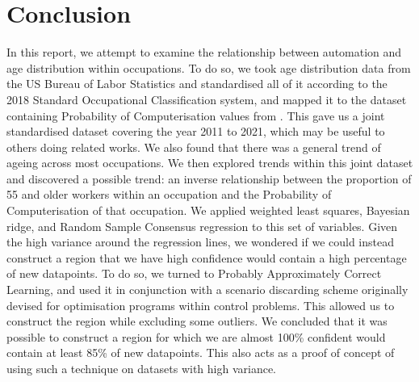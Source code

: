 \documentclass[11pt]{article}
\begin{document}
\clearpage

\section{Conclusion}
\label{sec:Conclusion}
In this report, we attempt to examine the relationship between automation and age distribution within occupations. To do so, we took age distribution data from the US Bureau of Labor Statistics and standardised all of it according to the 2018 Standard Occupational Classification system, and mapped it to the dataset containing Probability of Computerisation values from \cite{osborne2017future}. This gave us a joint standardised dataset covering the year 2011 to 2021, which may be useful to others doing related works. We also found that there was a general trend of ageing across most occupations. We then explored trends within this joint dataset and discovered a possible trend: an inverse relationship between the proportion of 55 and older workers within an occupation and the Probability of Computerisation of that occupation. We applied weighted least squares, Bayesian ridge, and Random Sample Consensus regression to this set of variables. Given the high variance around the regression lines, we wondered if we could instead construct a region that we have high confidence would contain a high percentage of new datapoints. To do so, we turned to Probably Approximately Correct Learning, and used it in conjunction with a scenario discarding scheme originally devised for optimisation programs within control problems. This allowed us to construct the region while excluding some outliers. We concluded that it was possible to construct a region for which we are almost 100\% confident would contain at least 85\% of new datapoints. This also acts as a proof of concept of using such a technique on datasets with high variance.
\end{document}
